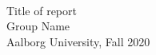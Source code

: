 \begin{titlepage}
    
    \centering
    {\fontsize{50}{60}\selectfont \slang}\\[1.3\baselineskip]
    {\huge Title of report}
    \\[3\baselineskip]
    \vfill
    {\Large Group Name}\\
    {\large Aalborg University, Fall 2020}
\end{titlepage}